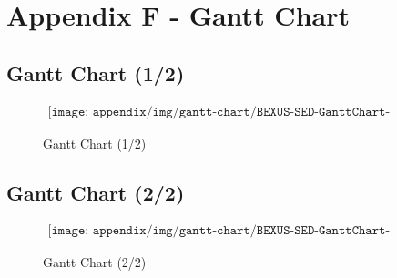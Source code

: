 \section{Appendix F - Gantt Chart} \label{sec:appF}
\subsection{Gantt Chart (1/2)}
\begin{figure}[H]
    \begin{align*}
        \texttt{[image: appendix/img/gantt-chart/BEXUS-SED-GanttChart-Complete-1.png]}
    \end{align*}
    \caption{Gantt Chart (1/2)}
    \label{fig:gantt-chart-1}
\end{figure}

\subsection{Gantt Chart (2/2)}

\begin{figure}[H]
    \begin{align*}
        \texttt{[image: appendix/img/gantt-chart/BEXUS-SED-GanttChart-Complete-2.png]}
    \end{align*}
    \caption{Gantt Chart (2/2)}
    \label{fig:gantt-chart-2}
\end{figure}
